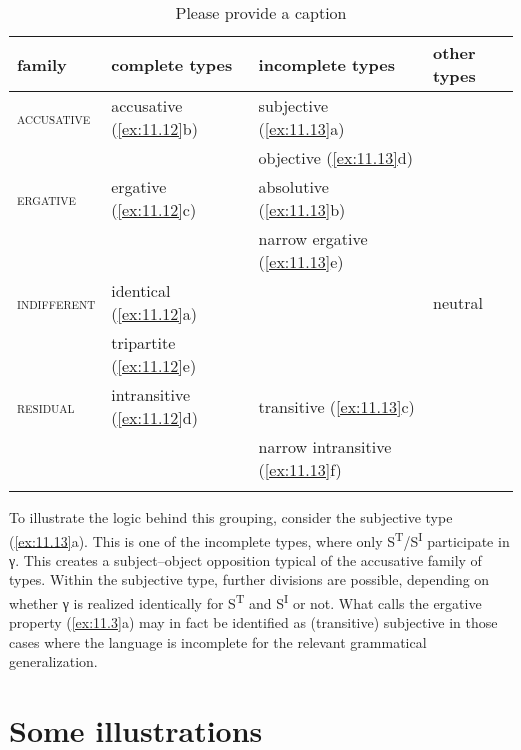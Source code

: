 \documentclass[output=paper]{langsci/langscibook}
\begin{document}
\begin{table}
\caption{\color{red}Please provide a caption\label{tab:fromex:11.14}}
    \begin{tabular}{llll}
    \lsptoprule
    family               & complete types                  & incomplete types          & other types \\
    \midrule
    \textsc{accusative}  & accusative (\ref{ex:11.12}b)   & subjective (\ref{ex:11.13}a)          & \\
                         &                                 & objective  (\ref{ex:11.13}d)          & \\
    \textsc{ergative}    & ergative (\ref{ex:11.12}c)  & absolutive (\ref{ex:11.13}b)          & \\
                         &                                 & narrow ergative (\ref{ex:11.13}e)     & \\
    \textsc{indifferent} & identical (\ref{ex:11.12}a)    & & neutral \\
                         & tripartite (\ref{ex:11.12}e)                &                           & \\
    \textsc{residual}    & intransitive (\ref{ex:11.12}d) & transitive (\ref{ex:11.13}c)          & \\
                         &                                 & narrow intransitive (\ref{ex:11.13}f) & \\
    \lspbottomrule
    \end{tabular}
\end{table}

To illustrate the logic behind this grouping, consider the subjective type
(\ref{ex:11.13}a). This is one of the incomplete types, where only
S\textsuperscript{T}/S\textsuperscript{I} participate in γ. This creates a
subject--object opposition typical of the accusative family of types. Within the
subjective type, further divisions are possible, depending on whether γ is
realized identically for S\textsuperscript{T} and S\textsuperscript{I} or not.
What \citet{Deal2015} calls the ergative property (\ref{ex:11.3}a) may in fact be
identified as (transitive) subjective in those cases where the language is
incomplete for the relevant grammatical generalization.

\section{Some illustrations}\label{sec:11.4}
\end{document}
